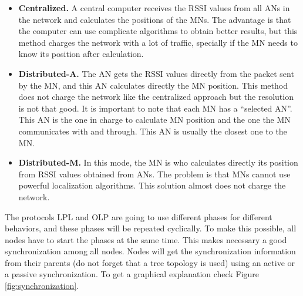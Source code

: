 \begin{itemize}
 \item \textbf{Centralized.} A central computer receives the \ac{RSSI} values from all \acp{AN} in the network and calculates the positions of 
the \acp{MN}. The advantage is that the computer can use complicate algorithms to obtain better results, but this method 
charges the network with a lot of traffic, specially if the \ac{MN} needs to know its position after calculation.
 \item \textbf{Distributed-A.} The \ac{AN} gets the \ac{RSSI} values directly from the packet sent by the \ac{MN}, and this \ac{AN}
calculates directly the \ac{MN} position. This method does not charge the network like the centralized approach but the resolution 
is not that good. It is important to note that each \ac{MN} has a ``selected \ac{AN}''. This \ac{AN} is the one in charge to 
calculate \ac{MN} position and the one the \ac{MN} communicates with and through. This \ac{AN} is usually the closest one to 
the \ac{MN}.
 \item \textbf{Distributed-M.} In this mode, the \ac{MN} is who calculates directly its position from \ac{RSSI} values obtained from \acp{AN}.
The problem is that \acp{MN} cannot use powerful localization algorithms. This solution almost does not charge the network.
\end{itemize}

The protocols \ac{LPL} and \ac{OLP} are going to use different phases for different behaviors, and these phases will be repeated cyclically. To 
make this possible, all nodes have to start the phases at the same time. This makes necessary a good synchronization among all nodes.
Nodes will get the synchronization information from their parents (do not forget that a tree topology is used) using an active or a passive synchronization. 
To get a graphical explanation check Figure \ref{fig:synchronization}.

